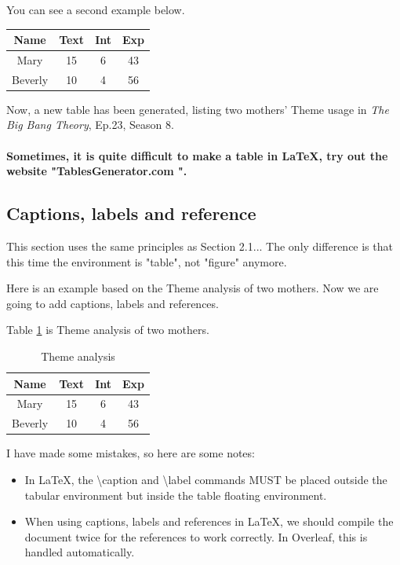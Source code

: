 \documentclass[12pt, letterpaper]{article}
\begin{document}
\begin{spacing}{1.3}
You can see a second example below.
\begin{center}
\begin{tabular}{|c | c c c|}
\hline
     Name & Text & Int & Exp \\ [0.5ex] %
\hline\hline %
     Mary & 15 & 6 & 43 \\
     Beverly & 10 & 4 & 56 \\
\hline
\end{tabular} 
\end{center}

Now, a new table has been generated, listing two mothers' Theme usage in \textit{The Big Bang Theory}, Ep.23, Season 8.

\paragraph{Sometimes, it is quite difficult to make a table in \LaTeX, try out the website "TablesGenerator.com ".}

\subsection{Captions, labels and reference}
This section uses the same principles as Section 2.1... The only difference is that this time the environment is "table", not "figure" anymore.

Here is an example based on the Theme analysis of two mothers. Now we are going to add captions, labels and references.

Table \ref{table:data} is Theme analysis of two mothers.
\begin{table}[h]
\begin{center}
\begin{tabular}{|c | c c c|}
\hline
     Name & Text & Int & Exp \\ 
\toprule
     Mary & 15 & 6 & 43 \\
     Beverly & 10 & 4 & 56 \\
\hline
\end{tabular} 
\end{center}
\caption{Theme analysis}
\label{table:data} %
\end{table}

I have made some mistakes, so here are some notes:

\begin{itemize}
    \item In \LaTeX, the \textbackslash caption and \textbackslash label commands MUST be placed outside the tabular environment but inside the table floating environment.
    \item When using captions, labels and references in \LaTeX, we should compile the document twice for the references to work correctly. In Overleaf, this is handled automatically.
\end{itemize}


\end{spacing}
\end{document}
